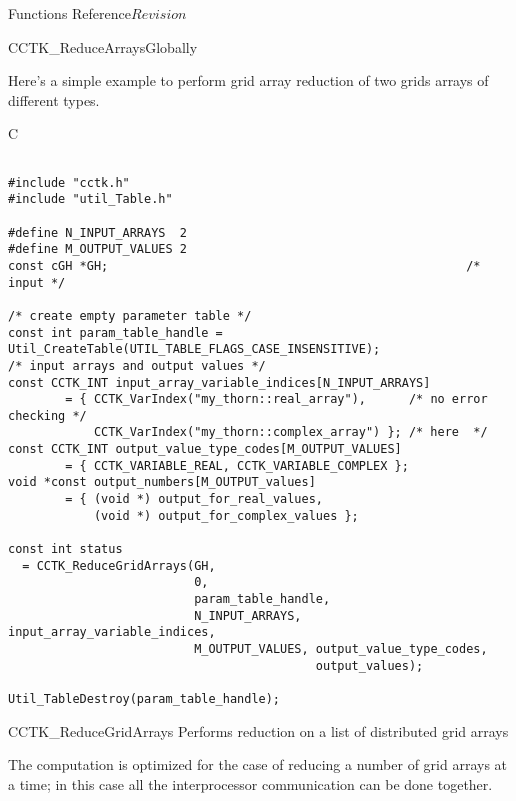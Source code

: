 \begin{cactuspart}{ Functions Reference}{}{$Revision$}
\begin{FunctionDescription}{CCTK\_ReduceArraysGlobally}
\begin{ExampleSection}
\begin{ExampleDescription}
Here's a simple example to perform grid array reduction of two grids arrays of different types.
\end{ExampleDescription}
\begin{Example}{C}
\begin{verbatim}

#include "cctk.h"
#include "util_Table.h"

#define N_INPUT_ARRAYS  2
#define M_OUTPUT_VALUES 2
const cGH *GH;                                                  /* input */

/* create empty parameter table */
const int param_table_handle = Util_CreateTable(UTIL_TABLE_FLAGS_CASE_INSENSITIVE);
/* input arrays and output values */
const CCTK_INT input_array_variable_indices[N_INPUT_ARRAYS]
        = { CCTK_VarIndex("my_thorn::real_array"),      /* no error checking */
            CCTK_VarIndex("my_thorn::complex_array") }; /* here  */
const CCTK_INT output_value_type_codes[M_OUTPUT_VALUES]
        = { CCTK_VARIABLE_REAL, CCTK_VARIABLE_COMPLEX };
void *const output_numbers[M_OUTPUT_values]
        = { (void *) output_for_real_values,
            (void *) output_for_complex_values };

const int status
  = CCTK_ReduceGridArrays(GH,
                          0,
                          param_table_handle,
                          N_INPUT_ARRAYS, input_array_variable_indices,
                          M_OUTPUT_VALUES, output_value_type_codes,
                                           output_values);

Util_TableDestroy(param_table_handle);
\end{verbatim}
\end{Example}
\end{ExampleSection}
\end{FunctionDescription}




\begin{FunctionDescription}{CCTK\_ReduceGridArrays}
\label{CCTK-ReduceGridArrays}
Performs reduction on a list of distributed grid arrays

The computation is optimized for the case of reducing a
number of grid arrays at a time; in this case all the interprocessor
communication can be done together.


\end{FunctionDescription}
\end{cactuspart}
